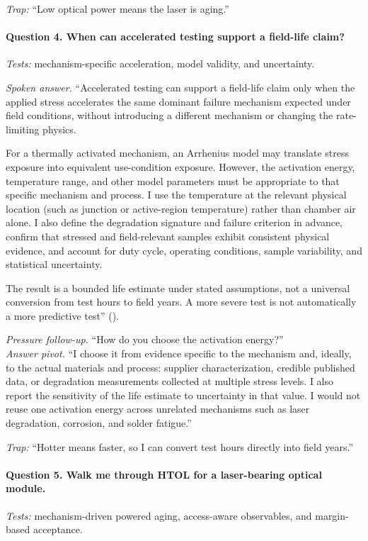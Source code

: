 \textit{Trap:} ``Low optical power means the laser is aging.''

\paragraph{Question 4. When can accelerated testing support a field-life claim?}
\textit{Tests:} mechanism-specific acceleration, model validity, and
uncertainty.

\textit{Spoken answer.}
``Accelerated testing can support a field-life claim only when the applied
stress accelerates the same dominant failure mechanism expected under field
conditions, without introducing a different mechanism or changing the
rate-limiting physics.

For a thermally activated mechanism, an Arrhenius model may translate stress
exposure into equivalent use-condition exposure. However, the activation
energy, temperature range, and other model parameters must be appropriate to
that specific mechanism and process. I use the temperature at the relevant
physical location (such as junction or active-region temperature) rather than
chamber air alone. I also define the degradation signature and failure criterion
in advance, confirm that stressed and field-relevant samples exhibit consistent
physical evidence, and account for duty cycle, operating conditions, sample
variability, and statistical uncertainty.

The result is a bounded life estimate under stated assumptions, not a universal
conversion from test hours to field years. A more severe test is not
automatically a more predictive test''
().

\textit{Pressure follow-up.} ``How do you choose the activation energy?''\\
\textit{Answer pivot.} ``I choose it from evidence specific to the mechanism
and, ideally, to the actual materials and process: supplier characterization,
credible published data, or degradation measurements collected at multiple
stress levels. I also report the sensitivity of the life estimate to uncertainty
in that value. I would not reuse one activation energy across unrelated
mechanisms such as laser degradation, corrosion, and solder fatigue.''

\textit{Trap:} ``Hotter means faster, so I can convert test hours directly into
field years.''

\paragraph{Question 5. Walk me through HTOL for a laser-bearing optical
module.}
\textit{Tests:} mechanism-driven powered aging, access-aware observables, and
margin-based acceptance.

